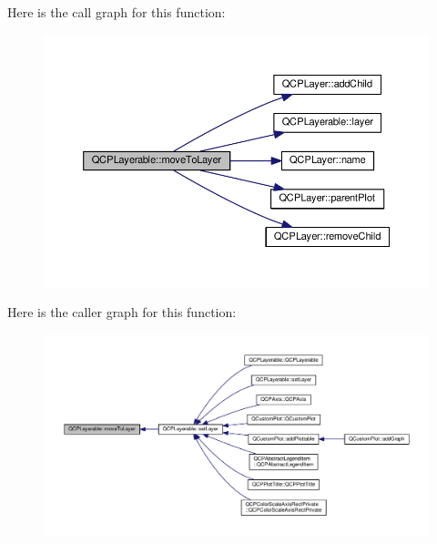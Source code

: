 Here is the call graph for this function\+:\nopagebreak
\begin{figure}[H]
\begin{center}
\leavevmode
\includegraphics[width=350pt]{class_q_c_p_layerable_af94484cfb7cbbddb7de522e9be71d9a4_cgraph}
\end{center}
\end{figure}




Here is the caller graph for this function\+:\nopagebreak
\begin{figure}[H]
\begin{center}
\leavevmode
\includegraphics[width=350pt]{class_q_c_p_layerable_af94484cfb7cbbddb7de522e9be71d9a4_icgraph}
\end{center}
\end{figure}


\hypertarget{class_q_c_p_layerable_a98d79f5b716d45eac4347befe546d0ec}{}
